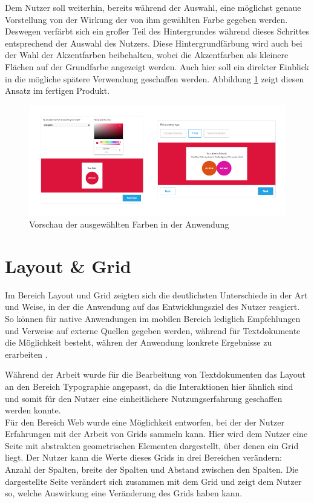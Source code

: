 Dem Nutzer soll weiterhin, bereits während der Auswahl, eine möglichst genaue Vorstellung von der Wirkung der von ihm gewählten Farbe gegeben werden. Deswegen verfärbt sich ein großer Teil des Hintergrundes während dieses Schrittes entsprechend der Auswahl des Nutzers. Diese Hintergrundfärbung wird auch bei der Wahl der Akzentfarben beibehalten, wobei die Akzentfarben als kleinere Flächen auf der Grundfarbe angezeigt werden. Auch hier soll ein direkter Einblick in die mögliche spätere Verwendung geschaffen werden. Abbildung \ref{fig:colors_bg} zeigt diesen Ansatz im fertigen Produkt.

\begin{figure}[h]
    \centering
    \includegraphics[width=1\textwidth]{images/colors_background.png}
    \caption{Vorschau der ausgewählten Farben in der Anwendung}
    \label{fig:colors_bg}
\end{figure}

\section{Layout \& Grid}

Im Bereich Layout und Grid zeigten sich die deutlichsten Unterschiede in der Art und Weise, in der die Anwendung auf das Entwicklungsziel des Nutzer reagiert.
So können für native Anwendungen im mobilen Bereich lediglich Empfehlungen und Verweise auf externe Quellen gegeben werden, während für Textdokumente die Möglichkeit besteht, währen der Anwendung konkrete Ergebnisse zu erarbeiten \cite{PoplawskiPP}.

Während der Arbeit wurde für die Bearbeitung von Textdokumenten das Layout an den Bereich Typographie angepasst, da die Interaktionen hier ähnlich sind und somit für den Nutzer eine einheitlichere Nutzungserfahrung geschaffen werden konnte.\\
Für den Bereich Web wurde eine Möglichkeit entworfen, bei der der Nutzer Erfahrungen mit der Arbeit von Grids sammeln kann. Hier wird dem Nutzer eine Seite mit abstrakten geometrischen Elementen dargestellt, über denen ein Grid liegt. Der Nutzer kann die Werte dieses Grids in drei Bereichen verändern: Anzahl der Spalten, breite der Spalten und Abstand zwischen den Spalten. Die dargestellte Seite verändert sich zusammen mit dem Grid und zeigt dem Nutzer so, welche Auswirkung eine Veränderung des Grids haben kann.

